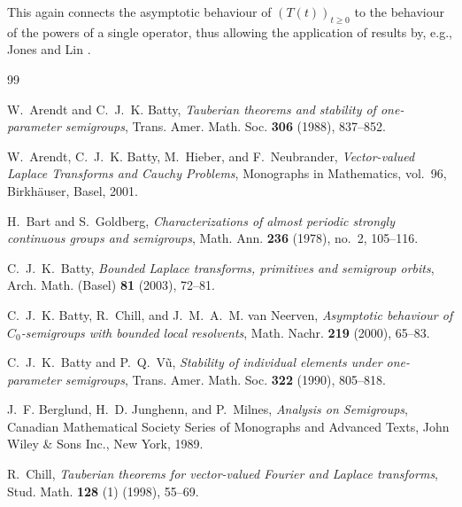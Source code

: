 \documentclass[11pt,intlimits, draft,oneside]{amsart}
\theoremstyle{definition}
\begin{document}
This again connects the asymptotic behaviour of $(T(t))_{t\geq0}$ 
to the behaviour of the powers of a single operator, thus allowing 
the application of results by, e.g., Jones and Lin \cite{jones/lin:1976, jones/lin:1980}.







\begin{thebibliography}{99}


W.~Arendt and C.~J.~K. Batty, %
\textit{Tauberian theorems and stability of one-parameter semigroups}, %
Trans. Amer. Math. Soc. \textbf{306} (1988), 837--852. %


W.~Arendt, C.~J.~K. Batty, M.~Hieber, and F.~Neubrander, %
\textit{{Vector-valued  {L}aplace {T}ransforms and {C}auchy {P}roblems}}, %
Monographs in Mathematics, vol.~96, Birkh\"{a}user, Basel, 2001. %


H.~Bart and S.~Goldberg, %
\textit{Characterizations of almost periodic strongly continuous groups and semigroups}, %
Math. Ann. \textbf{236} (1978), no.~2, 105--116. %


{C.~J.~K.~Batty}, %
\textit{Bounded Laplace transforms, primitives and semigroup orbits}, %
 {Arch. Math. (Basel)} \textbf{81} (2003), 72--81. %


C.~J.~K. Batty, R.~Chill, and J.~M.~A.~M. van Neerven, %
\textit{Asymptotic behaviour of {$C_0$}-semigroups with bounded local resolvents}, %
Math. Nachr.  \textbf{219} (2000), 65--83. %


C.~J.~K.~Batty and P.~Q.~V\~u, %
\textit{Stability of individual elements under one-parameter semigroups}, %
Trans. Amer. Math. Soc. \textbf{322} (1990), 805--818. %


J.~F. Berglund, H.~D. Junghenn, and P.~Milnes, %
\textit{Analysis on {S}emigroups}, %
Canadian Mathematical Society Series of Monographs and Advanced Texts, John Wiley \& Sons Inc., New York, 1989. %


R.~Chill, %
\textit{Tauberian theorems for vector-valued {F}ourier and {L}aplace transforms}, %
Stud. Math. \textbf{128} (1) (1998), 55--69. %



\end{thebibliography}
\end{document}
